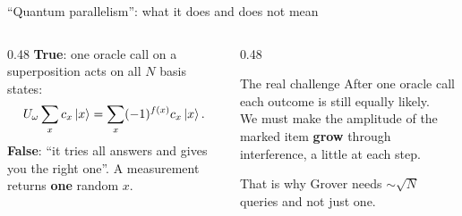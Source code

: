 \documentclass[aspectratio=169,11pt]{beamer}
\newcommand{\hl}[1]{{\color{qorange}\textbf{#1}}}
\newcommand{\key}[1]{{\color{qdark}\textbf{#1}}}
\newcommand{\Uo}{U_\omega}
\begin{document}
\begin{frame}{``Quantum parallelism'': what it does and does not mean}
  \begin{columns}[T]
    \begin{column}{0.48\textwidth}
      \key{True}: one oracle call on a superposition acts on all $N$ basis states:
      \[ \Uo\sum_x c_x\ket{x} = \sum_x (-1)^{f(x)}c_x\ket{x}. \]
      \vspace{1mm}
      \key{False}: ``it tries all answers and gives you the right one''. A measurement returns \hl{one} random $x$.
    \end{column}
    \begin{column}{0.48\textwidth}
      \begin{alertblock}{The real challenge}
        After one oracle call each outcome is still equally likely.\\[1mm]
        We must make the amplitude of the marked item \hl{grow} through interference, a little at each step.
      \end{alertblock}
      \vspace{1mm}
      That is why Grover needs $\sim\sqrt N$ queries and not just one.
    \end{column}
  \end{columns}
\end{frame}

\end{document}
